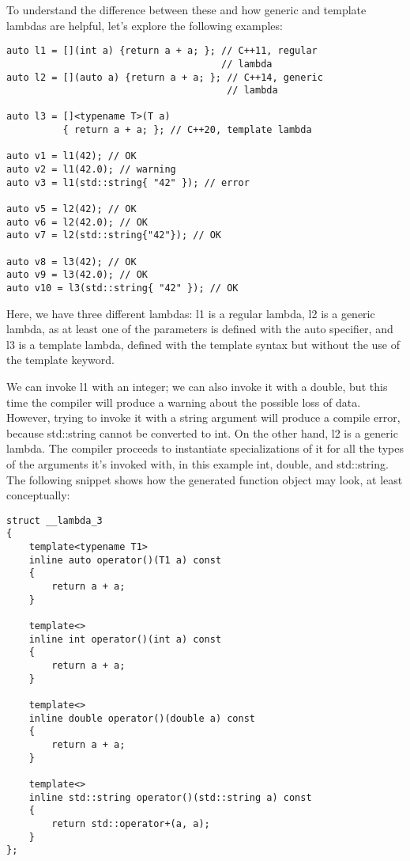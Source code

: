 To understand the difference between these and how generic and template lambdas are helpful, let's explore the following examples:

\begin{lstlisting}[style=styleCXX]
auto l1 = [](int a) {return a + a; }; // C++11, regular
                                      // lambda
auto l2 = [](auto a) {return a + a; }; // C++14, generic
                                       // lambda
                                       
auto l3 = []<typename T>(T a)
          { return a + a; }; // C++20, template lambda

auto v1 = l1(42); // OK
auto v2 = l1(42.0); // warning
auto v3 = l1(std::string{ "42" }); // error

auto v5 = l2(42); // OK
auto v6 = l2(42.0); // OK
auto v7 = l2(std::string{"42"}); // OK

auto v8 = l3(42); // OK
auto v9 = l3(42.0); // OK
auto v10 = l3(std::string{ "42" }); // OK
\end{lstlisting}

Here, we have three different lambdas: l1 is a regular lambda, l2 is a generic lambda, as at least one of the parameters is defined with the auto specifier, and l3 is a template lambda, defined with the template syntax but without the use of the template keyword.

We can invoke l1 with an integer; we can also invoke it with a double, but this time the compiler will produce a warning about the possible loss of data. However, trying to invoke it with a string argument will produce a compile error, because std::string cannot be converted to int. On the other hand, l2 is a generic lambda. The compiler proceeds to instantiate specializations of it for all the types of the arguments it's invoked with, in this example int, double, and std::string. The following snippet shows how the generated function object may look, at least conceptually:

\begin{lstlisting}[style=styleCXX]
struct __lambda_3
{
	template<typename T1>
	inline auto operator()(T1 a) const
	{
		return a + a;
	}

	template<>
	inline int operator()(int a) const
	{
		return a + a;
	}

	template<>
	inline double operator()(double a) const
	{
		return a + a;
	}

	template<>
	inline std::string operator()(std::string a) const
	{
		return std::operator+(a, a);
	}
};
\end{lstlisting}

